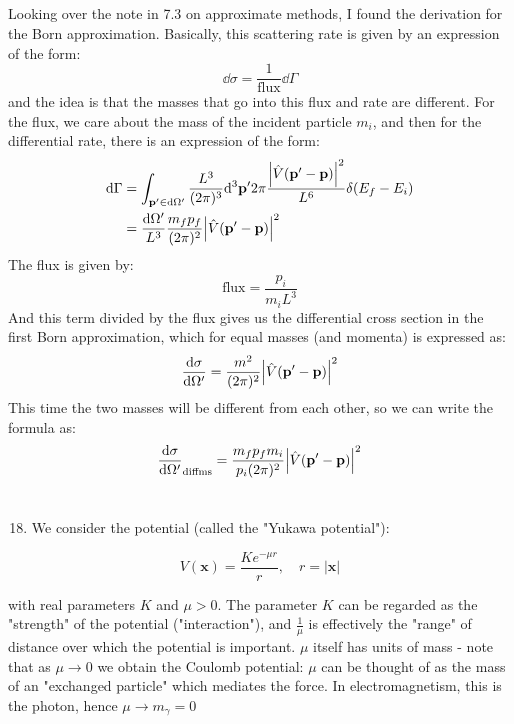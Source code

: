 \documentclass[12pt]{article}
\begin{document}
\subsection{}
Looking over the note in 7.3 on approximate methods, I found the derivation for the Born approximation. Basically, this scattering rate is given by an expression of the form:
\begin{equation}
  \dd{\sigma }= \frac{1}{\text{flux}}\dd{\Gamma }
\end{equation}
and the idea is that the masses that go into this flux and rate are different. For the flux, we care about the mass of the incident particle $m_{i}$,
and then for the differential rate, there is an expression of the form:
\begin{align}
  \dd{\Gamma }&= \int_{\mathbf{p'}\in \dd{\Omega '}}\frac{L^3}{(2\pi)^3}\dd^3{\mathbf{p'}} 2 \pi \frac{\abs{\hat{V}(\mathbf{p'}-\mathbf{p})}^2}{L^6}\delta (E_{f}-E_{i})\\
&= \frac{\dd{\Omega '}}{L^3}\frac{m_{f}p_f}{(2\pi)^2}\abs{\hat{V}(\mathbf{p'}-\mathbf{p})}^2
\end{align}
The flux is given by:
\begin{equation}
  \text{flux} = \frac{p_i}{m_i L^3}
\end{equation}
And this term divided by the flux gives us the differential cross section in the first Born approximation, which for equal masses (and momenta) is expressed as:
\begin{equation}
  \frac{\dd{\sigma }}{\dd{\Omega '}}= \frac{m^2}{(2\pi)^2}\abs{\hat{V}(\mathbf{p'}-\mathbf{p})}^2
\end{equation}
This time the two masses will be different from each other, so we can write the formula as:
\begin{equation}
  \frac{\dd{\sigma }}{\dd{\Omega '}}_{\text{diffms}}= \frac{m_{f}p_fm_{i}}{p_i(2\pi)^2}\abs{\hat{V}(\mathbf{p'}-\mathbf{p})}^2
\end{equation}
\section{}
\begin{enumerate}
  \setcounter{enumi}{17}
  \item We consider the potential (called the "Yukawa potential"):
\end{enumerate}

$$
V(\mathbf{x})=\frac{K e^{-\mu r}}{r}, \quad r=|\mathbf{x}|
$$

with real parameters $K$ and $\mu>0$. The parameter $K$ can be regarded as the "strength" of the potential ("interaction"), and $\frac{1}{\mu}$ is effectively the "range" of distance over which the potential is important. $\mu$ itself has units of mass - note that as $\mu \rightarrow 0$ we obtain the Coulomb potential: $\mu$ can be thought of as the mass of an "exchanged particle" which mediates the force. In electromagnetism, this is the photon, hence $\mu \rightarrow m_{\gamma}=0$
\end{document}
